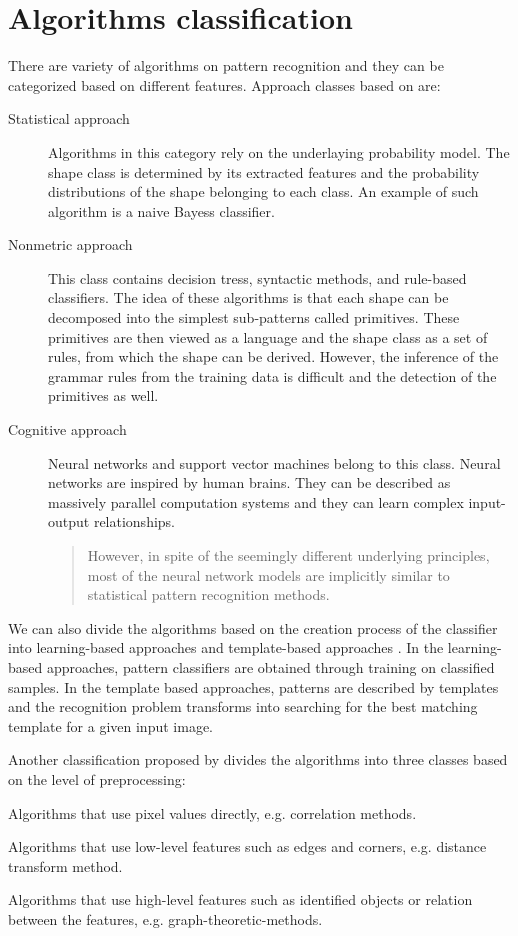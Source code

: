 \section{Algorithms classification}
There are variety of algorithms on pattern recognition and they can be categorized based on different features. Approach classes based on \citet{imageRecognition} are:
\begin{description}
\item [Statistical approach] Algorithms in this category rely on the underlaying probability model. The shape class is determined by its extracted features and the probability distributions of the shape belonging to each class. An example of such algorithm is a naive Bayess classifier.

\item [Nonmetric approach] This class contains decision tress, syntactic methods, and rule-based classifiers. The idea of these algorithms is that each shape can be decomposed into the simplest sub-patterns called primitives. These primitives are then viewed as a language and the shape class as a set of rules, from which the shape can be derived. However, the inference of the grammar rules from the training data is difficult and the detection of the primitives as well.

\item [Cognitive approach] Neural networks and support vector machines belong to this class. Neural networks are inspired by human brains. They can be described as massively parallel computation systems and they can learn complex input-output relationships. \begin{quotation} However, in spite of the seemingly different underlying principles, most of the neural network models are implicitly similar to statistical pattern recognition methods. \end{quotation} \cite{imageRecognition}

\end{description}

We can also divide the algorithms based on the creation process of the classifier into learning-based approaches and template-based approaches \cite{skeletonMatching}. In the learning-based approaches, pattern classifiers are obtained through training on classified samples. In the template based approaches, patterns are described by templates and the recognition problem transforms into searching for the best matching template for a given input image.

Another classification proposed by \citet{distanceTransform} divides the algorithms into three classes based on the level of preprocessing:
\begin{description}
\item Algorithms that use pixel values directly, e.g. correlation methods.
\item Algorithms that use low-level features such as edges and corners, e.g. distance transform method.
\item Algorithms that use high-level features such as identified objects or relation between the features, e.g. graph-theoretic-methods.
\end{description}

